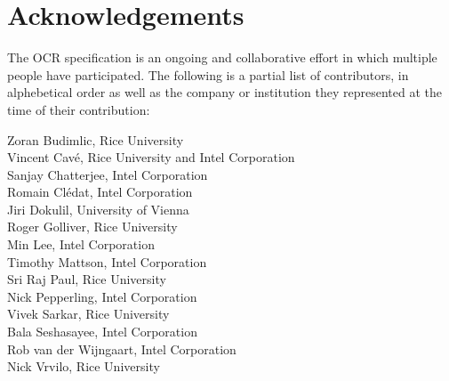 \chapter*{Acknowledgements}
The OCR specification is an ongoing and collaborative effort in which
multiple people have participated. The following is a partial list of
contributors, in alphebetical order as well as the company or
institution they represented at the time of their contribution:

Zoran Budimlic, Rice University\\
Vincent Cav\'e, Rice University and Intel Corporation\\
Sanjay Chatterjee, Intel Corporation\\
Romain Cl\'edat, Intel Corporation\\
Jiri Dokulil, University of Vienna\\
Roger Golliver, Rice University\\
Min Lee, Intel Corporation\\
Timothy Mattson, Intel Corporation\\
Sri Raj Paul, Rice University\\
Nick Pepperling, Intel Corporation\\
Vivek Sarkar, Rice University\\
Bala Seshasayee, Intel Corporation\\
Rob van der Wijngaart, Intel Corporation\\
Nick Vrvilo, Rice University\\
